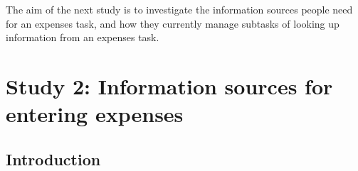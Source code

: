 \documentclass[11pt,oneside]{report}
\begin{document}
The aim of the next study is to investigate the information sources people need for an expenses task, and how they currently manage subtasks of looking up information from an expenses task. 

\section{Study 2: Information sources for entering expenses}

\subsection{Introduction}
\end{document}
